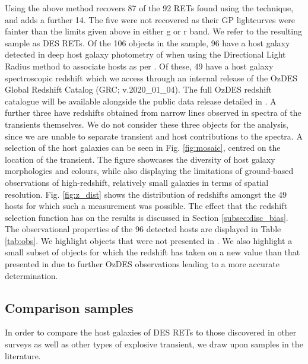 \documentclass[fleqn,usenatbib,]{mnras}
\begin{document}
Using the above method recovers 87 of the 92 RETs found using the  technique, and adds a further 14. The five were not recovered as their GP lightcurves were fainter than the limits given above in either g or r band.
We refer to the resulting sample as DES RETs. Of the 106 objects in the sample, 96 have a host galaxy detected in deep host galaxy photometry of  when using the Directional Light Radius method \citep{Sullivan2006} to associate hosts as per . Of these, 49 have a host galaxy spectroscopic redshift which we access through an internal release of the OzDES Global Redshift Catalog (GRC; v.2020\_01\_04). The full OzDES redshift catalogue will be available alongside the public data release detailed in \citet{Lidman2020}. A further three have redshifts obtained from narrow lines observed in spectra of the transients themselves. We do not consider these three objects for the analysis, since we are unable to separate transient and host contributions to the spectra.
A selection of the host galaxies can be seen in Fig. \ref{fig:mosaic}, centred on the location of the transient. The figure showcases the diversity of host galaxy morphologies and colours, while also displaying the limitations of ground-based observations of high-redshift, relatively small galaxies in terms of spatial resolution.
Fig. \ref{fig:z_dist} shows the distribution of redshifts amongst the 49 hosts for which such a measurement was possible. The effect that the redshift selection function has on the results is discussed in Section \ref{subsec:disc_bias}.
The observational properties of the 96 detected hosts are displayed in Table \ref{tab:obs}. We highlight objects that were not presented in . We also highlight a small subset of objects for which the redshift has taken on a new value than that presented in  due to further OzDES observations leading to a more accurate determination. 

\subsection{Comparison samples \label{subsec:comparison}}

In order to compare the host galaxies of DES RETs to those discovered in other surveys as well as other types of explosive transient, we draw upon samples in the literature. 
\end{document}

